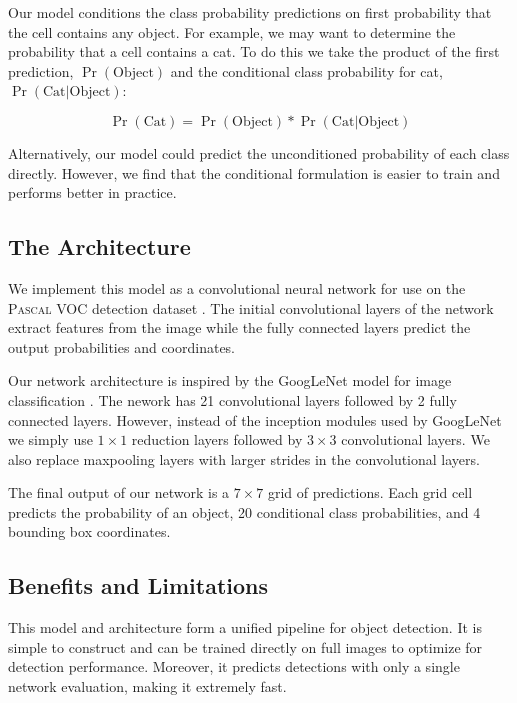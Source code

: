 \documentclass{article} %
\begin{document}
Our model conditions the class probability predictions on first probability that the cell contains any object. For example, we may want to determine the probability that a cell contains a cat. To do this we take the product of the first prediction, $\Pr(\textrm{Object})$ and the conditional class probability for cat, $\Pr(\textrm{Cat} | \textrm{Object})$:

\begin{equation}
\Pr(\textrm{Cat}) = \Pr(\textrm{Object}) * \Pr(\textrm{Cat} | \textrm{Object})
\end{equation}

Alternatively, our model could predict the unconditioned probability of each class directly. However, we find that the conditional formulation is easier to train and performs better in practice.

\subsection{The Architecture}

We implement this model as a convolutional neural network for use on the \textsc{Pascal} VOC detection dataset \cite{Everingham15}. The initial convolutional layers of the network extract features from the image while the fully connected layers predict the output probabilities and coordinates.

Our network architecture is inspired by the GoogLeNet model for image classification \cite{DBLP:journals/corr/SzegedyLJSRAEVR14}. The nework has 21 convolutional layers followed by 2 fully connected layers. However, instead of the inception modules used by GoogLeNet we simply use $1 \times 1$ reduction layers followed by $3 \times 3$ convolutional layers. We also replace maxpooling layers with larger strides in the convolutional layers.

The final output of our network is a $7 \times 7$ grid of predictions. Each grid cell predicts the probability of an object, 20 conditional class probabilities, and 4 bounding box coordinates.

\subsection{Benefits and Limitations}

This model and architecture form a unified pipeline for object detection. It is simple to construct and can be trained directly on full images to optimize for detection performance. Moreover, it predicts detections with only a single network evaluation, making it extremely fast.
\end{document}
